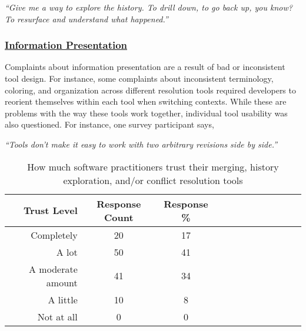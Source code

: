 \begin{displayquote}
\textit{``Give me a way to explore the history. To drill down, to go back up, you know? To resurface and understand what happened.''}
\end{displayquote}


\subsubsection{\underline{Information Presentation}}
Complaints about information presentation are a result of bad or inconsistent tool design. For instance, some complaints about inconsistent terminology, coloring, and organization across different resolution tools required developers to reorient themselves within each tool when switching contexts. While these are problems with the way these tools work together, individual tool usability was also questioned. For instance, one survey participant says, 
\begin{displayquote}
\textit{``Tools don't make it easy to work with two arbitrary revisions side by side.''}
\end{displayquote}


\begin{table}[!htbp]
\renewcommand{\arraystretch}{1.3}
\caption{How much software practitioners trust their merging, history exploration, and/or conflict resolution tools}
\label{survey_tool_trust}
\centering
\begin{tabularx}{0.45\textwidth}{@{}r|*{10}{C}c@{}}
\toprule
Trust Level & Response Count & Response \%\\
\midrule
Completely & 20 & 17\\
A lot & 50 & 41\\
A moderate amount & 41 & 34\\
A little & 10 & 8\\
Not at all & 0 & 0\\
\bottomrule
\end{tabularx}
\end{table}


